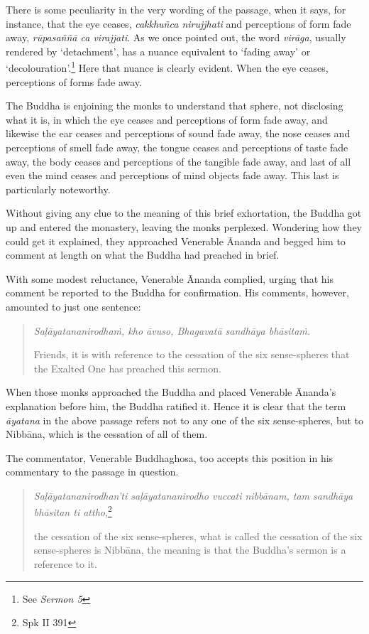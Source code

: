 There is some peculiarity in the very wording of the passage, when it says, for instance, that the eye ceases, \emph{cakkhuñca nirujjhati} and perceptions of form fade away, \emph{rūpasaññā ca virajjati}. As we once pointed out, the word \emph{virāga}, usually rendered by `detachment', has a nuance equivalent to `fading away' or `decolouration'.\footnote{See \emph{Sermon 5}} Here that nuance is clearly evident. When the eye ceases, perceptions of forms fade away.

The Buddha is enjoining the monks to understand that sphere, not disclosing what it is, in which the eye ceases and perceptions of form fade away, and likewise the ear ceases and perceptions of sound fade away, the nose ceases and perceptions of smell fade away, the tongue ceases and perceptions of taste fade away, the body ceases and perceptions of the tangible fade away, and last of all even the mind ceases and perceptions of mind objects fade away. This last is particularly noteworthy.

Without giving any clue to the meaning of this brief exhortation, the Buddha got up and entered the monastery, leaving the monks perplexed. Wondering how they could get it explained, they approached Venerable Ānanda and begged him to comment at length on what the Buddha had preached in brief.

With some modest reluctance, Venerable Ānanda complied, urging that his comment be reported to the Buddha for confirmation. His comments, however, amounted to just one sentence:

\begin{quote}
\emph{Saḷāyatananirodhaṁ, kho āvuso, Bhagavatā sandhāya bhāsitaṁ.}

Friends, it is with reference to the cessation of the six sense-spheres that the Exalted One has preached this sermon.
\end{quote}

When those monks approached the Buddha and placed Venerable Ānanda's explanation before him, the Buddha ratified it. Hence it is clear that the term \emph{āyatana} in the above passage refers not to any one of the six sense-spheres, but to Nibbāna, which is the cessation of all of them.

The commentator, Venerable Buddhaghosa, too accepts this position in his commentary to the passage in question.

\begin{quote}
\emph{Saḷāyatananirodhan'ti saḷāyatananirodho vuccati nibbānam, tam sandhāya bhāsitan ti attho},\footnote{Spk II 391}

the cessation of the six sense-spheres, what is called the cessation of the six sense-spheres is Nibbāna, the meaning is that the Buddha's sermon is a reference to it.
\end{quote}

